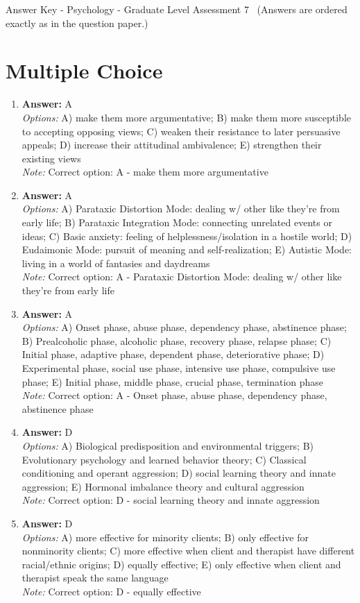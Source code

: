 \documentclass[12pt]{article}
\begin{document}
\begin{center}
Answer Key - Psychology - Graduate Level Assessment 7 \
\small (Answers are ordered exactly as in the question paper.)
\end{center}

\section*{Multiple Choice}
\begin{enumerate}[label=\arabic*.]
\item \textbf{Answer:} A
\\ \textit{Options:} A) make them more argumentative; B) make them more susceptible to accepting opposing views; C) weaken their resistance to later persuasive appeals; D) increase their attitudinal ambivalence; E) strengthen their existing views
\\ \textit{Note:} Correct option: A - make them more argumentative
\item \textbf{Answer:} A
\\ \textit{Options:} A) Parataxic Distortion Mode: dealing w/ other like they're from early life; B) Parataxic Integration Mode: connecting unrelated events or ideas; C) Basic anxiety: feeling of helplessness/isolation in a hostile world; D) Eudaimonic Mode: pursuit of meaning and self-realization; E) Autistic Mode: living in a world of fantasies and daydreams
\\ \textit{Note:} Correct option: A - Parataxic Distortion Mode: dealing w/ other like they're from early life
\item \textbf{Answer:} A
\\ \textit{Options:} A) Onset phase, abuse phase, dependency phase, abstinence phase; B) Prealcoholic phase, alcoholic phase, recovery phase, relapse phase; C) Initial phase, adaptive phase, dependent phase, deteriorative phase; D) Experimental phase, social use phase, intensive use phase, compulsive use phase; E) Initial phase, middle phase, crucial phase, termination phase
\\ \textit{Note:} Correct option: A - Onset phase, abuse phase, dependency phase, abstinence phase
\item \textbf{Answer:} D
\\ \textit{Options:} A) Biological predisposition and environmental triggers; B) Evolutionary psychology and learned behavior theory; C) Classical conditioning and operant aggression; D) social learning theory and innate aggression; E) Hormonal imbalance theory and cultural aggression
\\ \textit{Note:} Correct option: D - social learning theory and innate aggression
\item \textbf{Answer:} D
\\ \textit{Options:} A) more effective for minority clients; B) only effective for nonminority clients; C) more effective when client and therapist have different racial/ethnic origins; D) equally effective; E) only effective when client and therapist speak the same language
\\ \textit{Note:} Correct option: D - equally effective
\end{enumerate}
\end{document}
